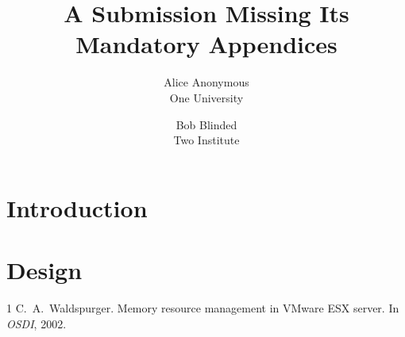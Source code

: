 \documentclass[letterpaper,twocolumn,10pt]{article}
\date{}
\title{\Large \bf A Submission Missing Its Mandatory Appendices}
\author{{\rm Alice Anonymous}\\One University \and {\rm Bob Blinded}\\Two Institute}
\begin{document}
\maketitle

\begin{abstract}
\lipsum[1][1-5]
\end{abstract}

\section{Introduction}
\lipsum[2-4]

\section{Design}
\lipsum[5-7]

\begin{thebibliography}{1}
 C.~A.\ Waldspurger. Memory resource management in VMware ESX
  server. In \emph{OSDI}, 2002.
\end{thebibliography}
\end{document}
